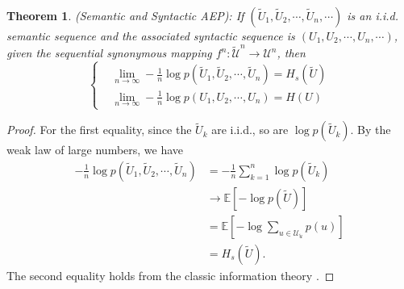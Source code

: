 \documentclass[12pt, draftclsnofoot,onecolumn]{IEEEtran}
\newtheorem{theorem}{\bf{Theorem}}
\begin{document}
\begin{theorem}\label{theorem5}
(Semantic and Syntactic AEP):
If $(\tilde {U}_1,\tilde {U}_2,\cdots,\tilde {U}_n,\cdots)$ is an i.i.d. semantic sequence and the associated syntactic sequence is $\left(U_1,U_2,\cdots,U_n,\cdots\right)$, given the sequential synonymous mapping $f^{n}: \tilde{\mathcal{U}}^{n}\to\mathcal{U}^{n}$, then
\begin{equation}
\left\{\begin{aligned}
&\lim_{n\to\infty}-\frac{1}{n}\log p(\tilde {U}_1,\tilde {U}_2,\cdots,\tilde {U}_n)=H_s(\tilde {U})\\
&\lim_{n\to\infty}-\frac{1}{n}\log p\left(U_1,U_2,\cdots,U_n\right)=H\left(U\right)
\end{aligned}
\right.
\end{equation}
\end{theorem}
\begin{proof}
For the first equality, since the $\tilde{U}_{k}$ are i.i.d., so are $\log p(\tilde{U}_{k})$. By the weak law of large numbers, we have
\begin{equation}
\begin{aligned}
-\frac{1}{n}\log p(\tilde {U}_1,\tilde {U}_2,\cdots,\tilde {U}_n)&=-\frac{1}{n}\sum_{k=1}^{n}\log p(\tilde{U}_{k})\\
&\to \mathbb{E} \left[-\log p(\tilde{U})\right]\\
&=\mathbb{E} \left[-\log \sum_{u\in \mathcal{U}_{\tilde{u}}}p(u)\right]\\
&=H_s(\tilde{U}).
\end{aligned}
\end{equation}
The second equality holds from the classic information theory \cite[Theorem 3.1.1]{Book_Cover}.
 \end{proof}
\end{document}
